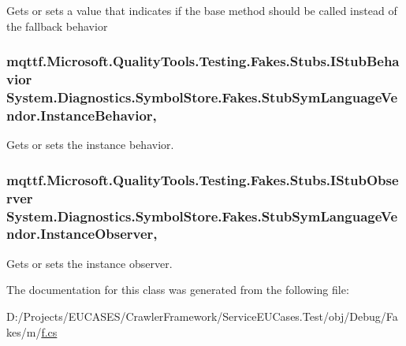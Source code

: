 Gets or sets a value that indicates if the base method should be called instead of the fallback behavior

\hypertarget{class_system_1_1_diagnostics_1_1_symbol_store_1_1_fakes_1_1_stub_sym_language_vendor_ae5e5aa3e8b810fd7ce3056b74cf493a4}{
\subsubsection[{Instance\-Behavior}]{\setlength{\rightskip}{0pt plus 5cm}mqttf.\-Microsoft.\-Quality\-Tools.\-Testing.\-Fakes.\-Stubs.\-I\-Stub\-Behavior System.\-Diagnostics.\-Symbol\-Store.\-Fakes.\-Stub\-Sym\-Language\-Vendor.\-Instance\-Behavior\hspace{0.3cm}{\ttfamily [get]}, {\ttfamily [set]}}}\label{class_system_1_1_diagnostics_1_1_symbol_store_1_1_fakes_1_1_stub_sym_language_vendor_ae5e5aa3e8b810fd7ce3056b74cf493a4}


Gets or sets the instance behavior.

\hypertarget{class_system_1_1_diagnostics_1_1_symbol_store_1_1_fakes_1_1_stub_sym_language_vendor_ac69c190e7b1c8aa5146e80ba95bf269a}{
\subsubsection[{Instance\-Observer}]{\setlength{\rightskip}{0pt plus 5cm}mqttf.\-Microsoft.\-Quality\-Tools.\-Testing.\-Fakes.\-Stubs.\-I\-Stub\-Observer System.\-Diagnostics.\-Symbol\-Store.\-Fakes.\-Stub\-Sym\-Language\-Vendor.\-Instance\-Observer\hspace{0.3cm}{\ttfamily [get]}, {\ttfamily [set]}}}\label{class_system_1_1_diagnostics_1_1_symbol_store_1_1_fakes_1_1_stub_sym_language_vendor_ac69c190e7b1c8aa5146e80ba95bf269a}


Gets or sets the instance observer.



The documentation for this class was generated from the following file\-:\begin{DoxyCompactItemize}
\item 
D\-:/\-Projects/\-E\-U\-C\-A\-S\-E\-S/\-Crawler\-Framework/\-Service\-E\-U\-Cases.\-Test/obj/\-Debug/\-Fakes/m/\hyperlink{m_2f_8cs}{f.\-cs}\end{DoxyCompactItemize}
